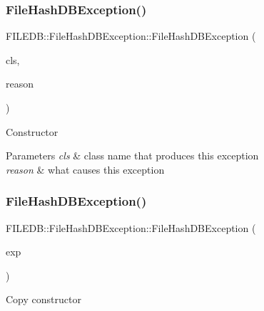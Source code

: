\subsubsection{\texorpdfstring{FileHashDBException()}{FileHashDBException()}\hspace{0.1cm}{\footnotesize\ttfamily [4/9]}}
{\footnotesize\ttfamily F\+I\+L\+E\+D\+B\+::\+File\+Hash\+D\+B\+Exception\+::\+File\+Hash\+D\+B\+Exception (\begin{DoxyParamCaption}\item[{const std\+::string \&}]{cls,  }\item[{const std\+::string \&}]{reason }\end{DoxyParamCaption})}

Constructor 
\begin{DoxyParams}{Parameters}
{\em cls} & class name that produces this exception \\
\hline
{\em reason} & what causes this exception \\
\hline
\end{DoxyParams}
\mbox{\label{classFILEDB_1_1FileHashDBException_ad018a7bda0cfd93d2efac5c16c10886e}} 
\subsubsection{\texorpdfstring{FileHashDBException()}{FileHashDBException()}\hspace{0.1cm}{\footnotesize\ttfamily [5/9]}}
{\footnotesize\ttfamily F\+I\+L\+E\+D\+B\+::\+File\+Hash\+D\+B\+Exception\+::\+File\+Hash\+D\+B\+Exception (\begin{DoxyParamCaption}\item[{const \mbox{\hyperlink{classFILEDB_1_1FileHashDBException}{File\+Hash\+D\+B\+Exception}} \&}]{exp }\end{DoxyParamCaption})}

Copy constructor \mbox{\label{classFILEDB_1_1FileHashDBException_aacf132dca5ed0d1b8dc3e4694c77c190}} 
